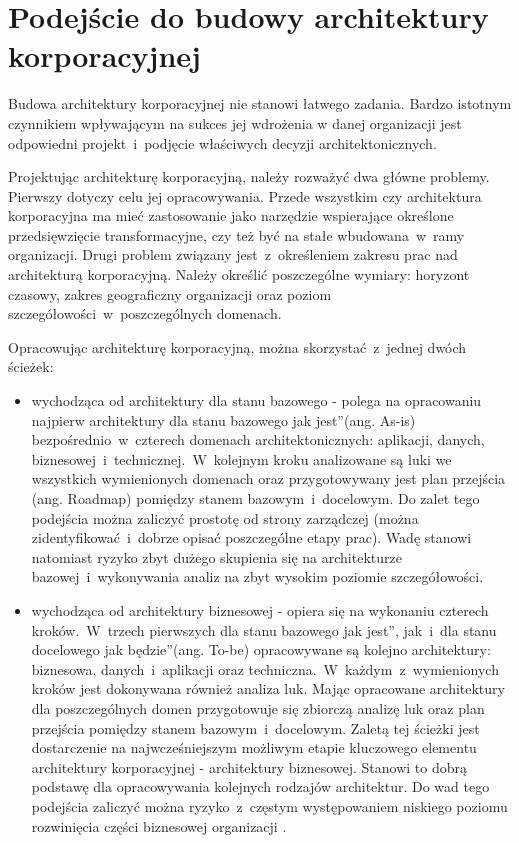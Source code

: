 \section{Podejście do budowy architektury korporacyjnej}
Budowa architektury korporacyjnej nie stanowi łatwego zadania. Bardzo istotnym czynnikiem wpływającym na sukces jej wdrożenia w danej organizacji jest odpowiedni projekt~i~podjęcie właściwych decyzji architektonicznych. 

Projektując architekturę korporacyjną, należy rozważyć dwa główne problemy. Pierwszy dotyczy celu jej opracowywania. Przede wszystkim czy architektura korporacyjna ma mieć zastosowanie jako narzędzie wspierające określone przedsięwzięcie transformacyjne, czy też być na stałe wbudowana~w~ramy organizacji. Drugi problem związany jest~z~określeniem zakresu prac nad architekturą korporacyjną. Należy określić poszczególne wymiary: horyzont czasowy, zakres geograficzny organizacji oraz poziom szczegółowości~w~poszczególnych domenach. 

Opracowując architekturę korporacyjną, można skorzystać~z~jednej dwóch ścieżek:
\begin{itemize}
\item{wychodząca od architektury dla stanu bazowego - polega na opracowaniu najpierw architektury dla stanu bazowego \quotedblbase jak jest\textquotedblright (ang. As-is) bezpośrednio~w~czterech domenach architektonicznych: aplikacji, danych, biznesowej~i~technicznej.~W~kolejnym kroku analizowane są luki we wszystkich wymienionych domenach oraz przygotowywany jest plan przejścia (ang. Roadmap) pomiędzy stanem bazowym~i~docelowym. Do zalet tego podejścia można zaliczyć prostotę od strony zarządczej (można zidentyfikować~i~dobrze opisać poszczególne etapy prac). Wadę stanowi natomiast ryzyko zbyt dużego skupienia się na architekturze bazowej~i~wykonywania analiz na zbyt wysokim poziomie szczegółowości.}
\item{wychodząca od architektury biznesowej - opiera się na wykonaniu czterech kroków.~W~trzech pierwszych dla stanu bazowego \quotedblbase jak jest\textquotedblright, jak~i~dla stanu docelowego \quotedblbase jak będzie\textquotedblright (ang. To-be) opracowywane są kolejno architektury: biznesowa, danych~i~aplikacji oraz techniczna.~W~każdym~z~wymienionych kroków jest dokonywana również analiza luk. Mając opracowane architektury dla poszczególnych domen przygotowuje się zbiorczą analizę luk oraz plan przejścia pomiędzy stanem bazowym~i~docelowym. Zaletą tej ścieżki jest dostarczenie na najwcześniejszym możliwym etapie kluczowego elementu architektury korporacyjnej - architektury biznesowej. Stanowi to dobrą podstawę dla opracowywania kolejnych rodzajów architektur. Do wad tego podejścia zaliczyć można ryzyko~z~częstym występowaniem niskiego poziomu rozwinięcia części biznesowej organizacji \cite{ArchKorpSob}.}
\end{itemize}

